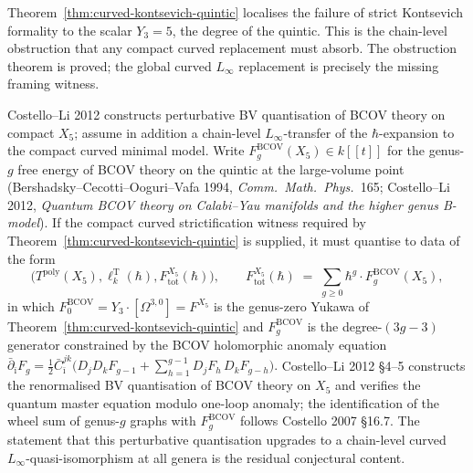 \begin{remark}
\label{rem:strict-formality-fails-quintic}
Theorem~\ref{thm:curved-kontsevich-quintic} localises the failure of strict
Kontsevich formality to the scalar $Y_3=5$, the degree of the quintic.
This is the chain-level obstruction that any compact curved replacement
must absorb. The obstruction theorem is proved; the global curved
$L_\infty$ replacement is precisely the missing framing witness.
\end{remark}

\begin{theorem}
\label{thm:curved-bcov-genus}
Costello--Li 2012 constructs perturbative BV quantisation of BCOV theory
on compact $X_5$; assume in addition a chain-level $L_\infty$-transfer
of the $\hbar$-expansion to the compact curved minimal model.
Write $F_g^{\mathrm{BCOV}}(X_5) \in k[[t]]$ for the genus-$g$ free energy of BCOV theory on the quintic at the large-volume point (Bershadsky--Cecotti--Ooguri--Vafa 1994, \textit{Comm.~Math.~Phys.}~165; Costello--Li 2012, \textit{Quantum BCOV theory on Calabi--Yau manifolds and the higher genus B-model}). If the compact curved strictification witness required by Theorem~\ref{thm:curved-kontsevich-quintic} is supplied, it must quantise to data of the form
\[
 \bigl(T^{\mathrm{poly}}(X_5), \ell_k^{\mathrm{T}}(\hbar), F_{\mathrm{tot}}^{X_5}(\hbar)\bigr), \qquad
 F_{\mathrm{tot}}^{X_5}(\hbar) \;=\; \sum_{g \geq 0} \hbar^g \cdot F_g^{\mathrm{BCOV}}(X_5),
\]
in which $F_0^{\mathrm{BCOV}} = Y_3 \cdot [\Omega^{3,0}] = F^{X_5}$ is the genus-zero Yukawa of Theorem~\ref{thm:curved-kontsevich-quintic} and $F_g^{\mathrm{BCOV}}$ is the degree-$(3g-3)$ generator constrained by the BCOV holomorphic anomaly equation
$
 \bar\partial_{\bar\imath} F_g = \tfrac{1}{2} \bar{C}_{\bar\imath}^{jk} \bigl(D_j D_k F_{g-1} + \sum_{h=1}^{g-1} D_j F_h \, D_k F_{g-h}\bigr).
$
Costello--Li 2012 \S4--5 constructs the renormalised BV quantisation of BCOV theory on $X_5$ and verifies the quantum master equation modulo one-loop anomaly; the identification of the wheel sum of genus-$g$ graphs with $F_g^{\mathrm{BCOV}}$ follows Costello 2007 \S16.7. The statement that this perturbative quantisation upgrades to a chain-level curved $L_\infty$-quasi-isomorphism at all genera is the residual conjectural content.
\end{theorem}

